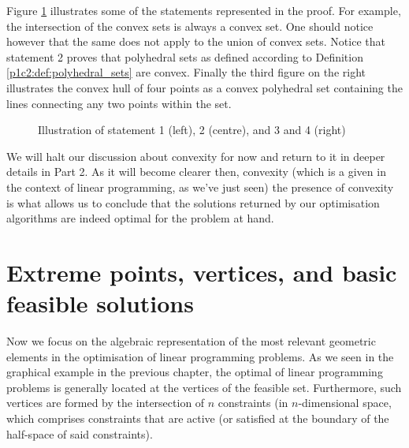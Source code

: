 Figure \ref{p1c2:fig:convexity_theorem_examples} illustrates some of the statements represented in the proof. For example, the intersection of the convex sets is always a convex set. One should notice however that the same does not apply to the union of convex sets. Notice that statement 2 proves that polyhedral sets as defined according to Definition \ref{p1c2:def:polyhedral_sets} are convex. Finally the third figure on the right illustrates the convex hull of four points as a convex polyhedral set containing the lines connecting any two points within the set. 
 
\begin{figure}
    \vspace{-6pt}
	\caption{Illustration of statement 1 (left), 2 (centre), and 3 and 4 (right)} \label{p1c2:fig:convexity_theorem_examples}
\end{figure}	

We will halt our discussion about convexity for now and return to it in deeper details in Part 2. As it will become clearer then, convexity (which is a given in the context of linear programming, as we've just seen) the presence of convexity is what allows us to conclude that the solutions returned by our optimisation algorithms are indeed optimal for the problem at hand. 


\section{Extreme points, vertices, and basic feasible solutions}

Now we focus on the algebraic representation of the most relevant geometric elements in the optimisation of linear programming problems. As we seen in the graphical example in the previous chapter, the optimal of linear programming problems is generally located at the vertices of the feasible set. Furthermore, such vertices are formed by the intersection of $n$ constraints (in $n$-dimensional space, which comprises constraints that are active (or satisfied at the boundary of the half-space of said constraints).

